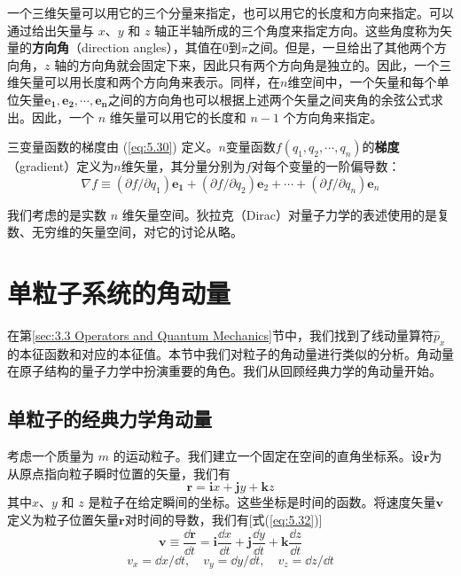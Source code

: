     一个三维矢量可以用它的三个分量来指定，也可以用它的长度和方向来指定。可以通过给出矢量与 $x$、$y$ 和 $z$ 轴正半轴所成的三个角度来指定方向。这些角度称为矢量的\textbf{方向角}（direction angles），其值在$0$到$\pi$之间。但是，一旦给出了其他两个方向角，$z$ 轴的方向角就会固定下来，因此只有两个方向角是独立的。因此，一个三维矢量可以用长度和两个方向角来表示。同样，在$n$维空间中，一个矢量和每个单位矢量$\mathbf{e_1},\mathbf{e_2},\cdots,\mathbf{e_n}$之间的方向角也可以根据上述两个矢量之间夹角的余弦公式求出。因此，一个 $n$ 维矢量可以用它的长度和 $n-1$ 个方向角来指定。

    三变量函数的梯度由 (\ref{eq:5.30}) 定义。$n$变量函数$f\left(q_1,q_2,\cdots,q_n\right)$的\textbf{梯度}（gradient）定义为$n$维矢量，其分量分别为$f$对每个变量的一阶偏导数：
    \begin{equation*}
        \nabla f \equiv \left(\partial f/\partial q_1\right)\mathbf{e_1} + \left(\partial f/\partial q_2\right)\mathbf{e}_2 + \cdots + \left(\partial f/\partial q_n\right)\mathbf{e}_n
    \end{equation*}

    我们考虑的是实数 $n$ 维矢量空间。狄拉克（Dirac）对量子力学的表述使用的是复数、无穷维的矢量空间，对它的讨论从略。

\section{单粒子系统的角动量}
\label{sec:5.3 Angular Momentum of a One-Particle System}
    在第\ref{sec:3.3 Operators and Quantum Mechanics}节中，我们找到了线动量算符$\hat{p}_x$的本征函数和对应的本征值。本节中我们对粒子的角动量进行类似的分析。角动量在原子结构的量子力学中扮演重要的角色。我们从回顾经典力学的角动量开始。

    \subsection*{单粒子的经典力学角动量}
    考虑一个质量为 $m$ 的运动粒子。我们建立一个固定在空间的直角坐标系。设$\mathbf{r}$为从原点指向粒子瞬时位置的矢量，我们有
    \begin{equation}
        \mathbf{r} = \mathbf{i}x + \mathbf{j}y + \mathbf{k}z
        \label{eq:5.33}
    \end{equation}
    其中$x$、$y$ 和 $z$ 是粒子在给定瞬间的坐标。这些坐标是时间的函数。将速度矢量$\mathbf{v}$定义为粒子位置矢量$\mathbf{r}$对时间的导数，我们有[式(\ref{eq:5.32})]
    \begin{equation}
        \mathbf{v} \equiv \frac{\dd \mathbf{r}}{\dd t} = \mathbf{i}\frac{\dd x}{\dd t} + \mathbf{j}\frac{\dd y}{\dd t} + \mathbf{k}\frac{\dd z}{\dd t}
        \label{eq:5.34}
    \end{equation}
    \begin{equation*}
        v_x = \dd x/\dd t, \quad v_y = \dd y/\dd t, \quad v_z = \dd z/\dd t
    \end{equation*}

